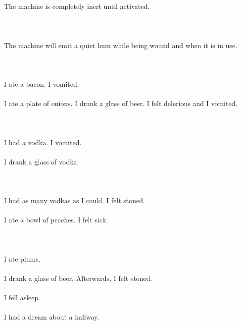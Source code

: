 \documentclass{article}
\begin{document}
    \section{}
    The machine is completely inert until activated.\\\\ 
    \newpage
    
    \section{}
    The machine will emit a quiet hum while being wound and when it is in use.\\\\ 
    \newpage
    
    \section{}
    I ate a bacon. I vomited.\\\\I ate a plate of onions. I drank a glass of beer. I felt delerious and I vomited.\\\\ 
    \newpage
    
    \section{}
    I had a vodka. I vomited.\\\\I drank a glass of vodka.\\\\ 
    \newpage
    
    \section{}
    I had as many vodkas as I could. I felt stoned.\\\\I ate a bowl of peaches. I felt sick.\\\\ 
    \newpage
    
    \section{}
    I ate plums.\\\\I drank a glass of beer. Afterwards, I felt stoned.\\\\I fell asleep.\\\\I had a dream about a hallway.\\\\ 
    \newpage
    
\end{document}
